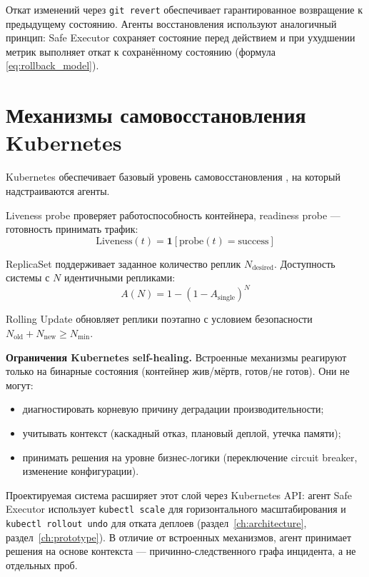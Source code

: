 Откат изменений через \texttt{git revert} обеспечивает гарантированное возвращение к предыдущему состоянию. Агенты восстановления используют аналогичный принцип: Safe Executor сохраняет состояние перед действием и при ухудшении метрик выполняет откат к сохранённому состоянию (формула \ref{eq:rollback_model}).

\section{Механизмы самовосстановления Kubernetes}

Kubernetes обеспечивает базовый уровень самовосстановления \cite{burns_kubernetes,kubernetes_self_healing,kubernetes_docs}, на который надстраиваются агенты.

Liveness probe проверяет работоспособность контейнера, readiness probe --- готовность принимать трафик:
\begin{equation}
\text{Liveness}(t) = \mathbf{1}[\text{probe}(t) = \text{success}]
\label{eq:liveness_probe}
\end{equation}

ReplicaSet поддерживает заданное количество реплик $N_{\text{desired}}$. Доступность системы с $N$ идентичными репликами:
\begin{equation}
A(N) = 1 - (1 - A_{\text{single}})^N
\label{eq:replica_availability}
\end{equation}

Rolling Update обновляет реплики поэтапно с условием безопасности $N_{\text{old}} + N_{\text{new}} \geq N_{\text{min}}$.

\textbf{Ограничения Kubernetes self-healing.} Встроенные механизмы реагируют только на бинарные состояния (контейнер жив/мёртв, готов/не готов). Они не могут:
\begin{itemize}
    \item диагностировать корневую причину деградации производительности;
    \item учитывать контекст (каскадный отказ, плановый деплой, утечка памяти);
    \item принимать решения на уровне бизнес-логики (переключение circuit breaker, изменение конфигурации).
\end{itemize}

Проектируемая система расширяет этот слой через Kubernetes API: агент Safe Executor использует \texttt{kubectl scale} для горизонтального масштабирования и \texttt{kubectl rollout undo} для отката деплоев (раздел~\ref{ch:architecture}, раздел~\ref{ch:prototype}). В отличие от встроенных механизмов, агент принимает решения на основе контекста --- причинно-следственного графа инцидента, а не отдельных проб.

